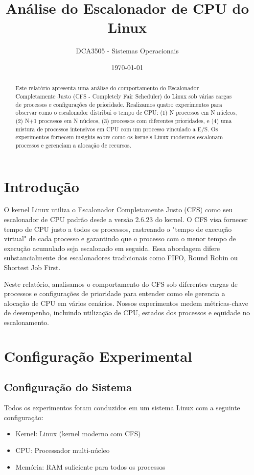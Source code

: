 \documentclass[12pt,a4paper]{article}
\title{\Large\textbf{Análise do Escalonador de CPU do Linux}}
\author{DCA3505 - Sistemas Operacionais}
\date{\today}
\begin{document}
\maketitle

\begin{abstract}
Este relatório apresenta uma análise do comportamento do Escalonador Completamente Justo (CFS - Completely Fair Scheduler) do Linux sob várias cargas de processos e configurações de prioridade. Realizamos quatro experimentos para observar como o escalonador distribui o tempo de CPU: (1) N processos em N núcleos, (2) N+1 processos em N núcleos, (3) processos com diferentes prioridades, e (4) uma mistura de processos intensivos em CPU com um processo vinculado a E/S. Os experimentos fornecem insights sobre como os kernels Linux modernos escalonam processos e gerenciam a alocação de recursos.
\end{abstract}

\tableofcontents
\newpage

\section{Introdução}

O kernel Linux utiliza o Escalonador Completamente Justo (CFS) como seu escalonador de CPU padrão desde a versão 2.6.23 do kernel. O CFS visa fornecer tempo de CPU justo a todos os processos, rastreando o "tempo de execução virtual" de cada processo e garantindo que o processo com o menor tempo de execução acumulado seja escalonado em seguida. Essa abordagem difere substancialmente dos escalonadores tradicionais como FIFO, Round Robin ou Shortest Job First.

Neste relatório, analisamos o comportamento do CFS sob diferentes cargas de processos e configurações de prioridade para entender como ele gerencia a alocação de CPU em vários cenários. Nossos experimentos medem métricas-chave de desempenho, incluindo utilização de CPU, estados dos processos e equidade no escalonamento.

\section{Configuração Experimental}

\subsection{Configuração do Sistema}
Todos os experimentos foram conduzidos em um sistema Linux com a seguinte configuração:
\begin{itemize}
    \item Kernel: Linux (kernel moderno com CFS)
    \item CPU: Processador multi-núcleo
    \item Memória: RAM suficiente para todos os processos
\end{itemize}
\end{document}
